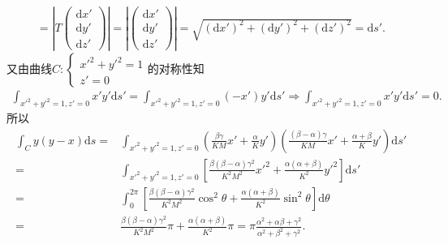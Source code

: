 \documentclass[../../main.tex]{subfiles}%
\begin{document}
\begin{solution}
\begin{align*}
= \left| T\begin{pmatrix} \mathrm{d}x'\\ \mathrm{d}y'\\ \mathrm{d}z' \end{pmatrix} \right|
= \left| \begin{pmatrix} \mathrm{d}x'\\ \mathrm{d}y'\\ \mathrm{d}z' \end{pmatrix} \right|
= \sqrt{(\mathrm{d}x')^2+(\mathrm{d}y')^2+(\mathrm{d}z')^2}
= \mathrm{d}s'.
\end{align*}
又由曲线$C:\begin{cases}x'^2+y'^2=1\\z'=0\end{cases}$的对称性知
\begin{align*}
\int_{x'^2+y'^2=1,z'=0}x'y'\mathrm{d}s'
= \int_{x'^2+y'^2=1,z'=0}(-x')y'\mathrm{d}s'
\Longrightarrow
\int_{x'^2+y'^2=1,z'=0}x'y'\mathrm{d}s'=0.
\end{align*}
所以
\begin{align*}
\int_C y(y-x)\mathrm{d}s
=& \int_{x'^2+y'^2=1,z'=0}\left( \frac{\beta\gamma}{KM}x'+\frac{\alpha}{K}y' \right)\left( \frac{(\beta-\alpha)\gamma}{KM}x'+\frac{\alpha+\beta}{K}y' \right)\mathrm{d}s'\\
=& \int_{x'^2+y'^2=1,z'=0}\left[ \frac{\beta(\beta-\alpha)\gamma^2}{K^2M^2}x'^2+\frac{\alpha(\alpha+\beta)}{K^2}y'^2 \right]\mathrm{d}s'\\
=& \int_0^{2\pi}\left[ \frac{\beta(\beta-\alpha)\gamma^2}{K^2M^2}\cos^2\theta+\frac{\alpha(\alpha+\beta)}{K^2}\sin^2\theta \right]\mathrm{d}\theta\\
=& \frac{\beta(\beta-\alpha)\gamma^2}{K^2M^2}\pi + \frac{\alpha(\alpha+\beta)}{K^2}\pi
= \pi \frac{\alpha^2+\alpha\beta+\gamma^2}{\alpha^2+\beta^2+\gamma^2}.
\end{align*}
\end{solution}
\end{document}
